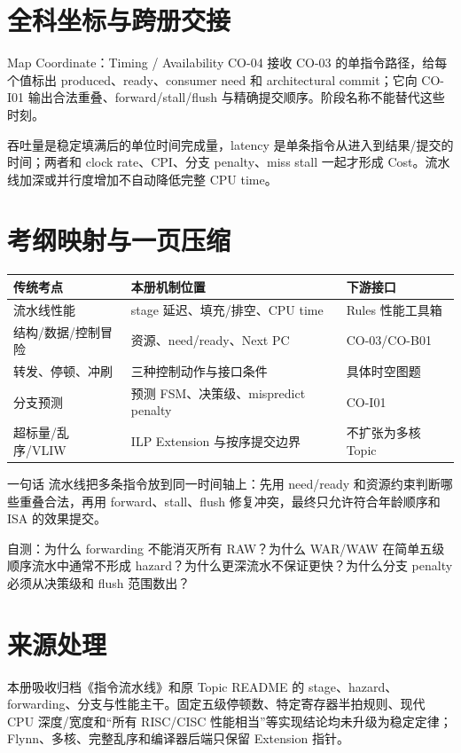 \documentclass[UTF8,fontset=fandol,11pt,a4paper]{ctexart}
\begin{document}
\section{全科坐标与跨册交接}
\begin{corebox}{Map Coordinate：Timing / Availability}
CO-04 接收 CO-03 的单指令路径，给每个值标出 produced、ready、consumer need 和 architectural commit；它向 CO-I01 输出合法重叠、forward/stall/flush 与精确提交顺序。阶段名称不能替代这些时刻。
\end{corebox}
吞吐量是稳定填满后的单位时间完成量，latency 是单条指令从进入到结果/提交的时间；两者和 clock rate、CPI、分支 penalty、miss stall 一起才形成 Cost。流水线加深或并行度增加不自动降低完整 CPU time。

\section{考纲映射与一页压缩}

\begin{center}
\small
\begin{tabularx}{\linewidth}{L{3.2cm}Y Y}
\toprule
传统考点 & 本册机制位置 & 下游接口\\
\midrule
流水线性能 & stage 延迟、填充/排空、CPU time & Rules 性能工具箱\\
结构/数据/控制冒险 & 资源、need/ready、Next PC & CO-03/CO-B01\\
转发、停顿、冲刷 & 三种控制动作与接口条件 & 具体时空图题\\
分支预测 & 预测 FSM、决策级、mispredict penalty & CO-I01\\
超标量/乱序/VLIW & ILP Extension 与按序提交边界 & 不扩张为多核 Topic\\
\bottomrule
\end{tabularx}
\end{center}

\begin{corebox}{一句话}
流水线把多条指令放到同一时间轴上：先用 need/ready 和资源约束判断哪些重叠合法，再用 forward、stall、flush 修复冲突，最终只允许符合年龄顺序和 ISA 的效果提交。
\end{corebox}

自测：为什么 forwarding 不能消灭所有 RAW？为什么 WAR/WAW 在简单五级顺序流水中通常不形成 hazard？为什么更深流水不保证更快？为什么分支 penalty 必须从决策级和 flush 范围数出？

\section{来源处理}

本册吸收归档《指令流水线》和原 Topic README 的 stage、hazard、forwarding、分支与性能主干。固定五级停顿数、特定寄存器半拍规则、现代 CPU 深度/宽度和“所有 RISC/CISC 性能相当”等实现结论均未升级为稳定定律；Flynn、多核、完整乱序和编译器后端只保留 Extension 指针。
\end{document}
